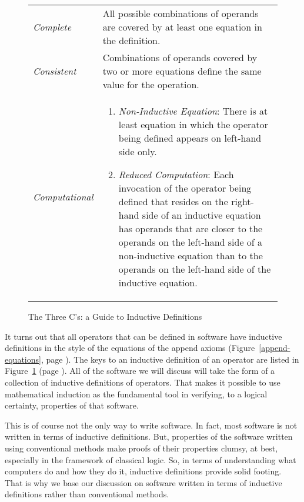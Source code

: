 \begin{figure}
\begin{center}
\begin{tabular}{lp{3.5in}}
\emph{Complete} & All possible combinations of operands are covered by at least one equation in the definition. \\
\emph{Consistent} & Combinations of operands covered by two or more equations define the same value for the operation. \\
\emph{Computational} &
\begin{enumerate}
\item \emph{Non-Inductive Equation}: There is at least equation in which
the operator being defined appears on left-hand side only.
\item \emph{Reduced Computation}: Each invocation of the operator being defined that resides on
            the right-hand side of an inductive equation has operands that
            are closer to the operands on the left-hand side of a non-inductive equation than to
            the operands on the left-hand side of the inductive equation.
\end{enumerate}
\end{tabular}
\end{center}
\caption{The Three C's: a Guide to Inductive Definitions}
\label{fig:inductive-def-keys}
\end{figure}

It turns out that all operators that can be defined in
software
have inductive definitions in the style of the equations
of the append axioms (Figure~\ref{append-equations}, page \pageref{append-equations}).
The keys to an inductive definition of an operator are  listed in
Figure~\ref{fig:inductive-def-keys} (page \pageref{fig:inductive-def-keys}).
All of the software we will discuss will take the form of a collection
of inductive definitions of operators.
That makes it possible to use mathematical induction as
the fundamental tool in verifying, to a logical certainty,
properties of that software.

This is of course not the only way to write software.
In fact, most software is not written in terms of inductive definitions.
But, properties of the software written using conventional methods
make
proofs of their properties clumsy, at best, especially in the framework of classical logic.
So, in terms of understanding what computers do and how they do it,
inductive definitions provide solid footing.
That is why we base our discussion on software written
in terms of inductive definitions rather than conventional methods.


